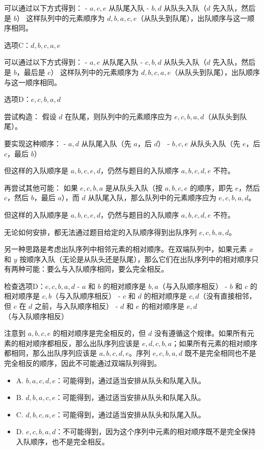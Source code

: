 \documentclass[lang=cn,newtx,10pt,scheme=chinese]{../../../elegantbook}
\begin{document}
\begin{enumerate}
    可以通过以下方式得到：
    - $a, c, e$ 从队尾入队
    - $b, d$ 从队头入队（$d$ 先入队，然后是 $b$）
    这样队列中的元素顺序为 $d, b, a, c, e$（从队头到队尾），出队顺序与这一顺序相同。
    
    选项C：$d, b, c, a, e$
    
    可以通过以下方式得到：
    - $a, e$ 从队尾入队
    - $c, b, d$ 从队头入队（$d$ 先入队，然后是 $b$，最后是 $c$）
    这样队列中的元素顺序为 $d, b, c, a, e$（从队头到队尾），出队顺序与这一顺序相同。
    
    选项D：$e, c, b, a, d$
    
    尝试构造：
    假设 $d$ 在队尾，则队列中的元素顺序应为 $e, c, b, a, d$（从队头到队尾）。
    
    要实现这种顺序：
    - $a, d$ 从队尾入队（先 $a$，后 $d$）
    - $b, c, e$ 从队头入队（先 $e$，后 $c$，最后 $b$）
    
    但这样的入队顺序是 $a, b, c, e, d$，仍然与题目的入队顺序 $a, b, c, d, e$ 不符。

    再尝试其他可能：
    如果 $e, c, b, a$ 是从队头入队（按 $a, b, c, e$ 的顺序，即先 $e$，然后 $c$，然后 $b$，最后 $a$），而 $d$ 从队尾入队，那么队列中的元素顺序应为 $e, c, b, a, d$。
    
    但这样的入队顺序是 $a, b, c, e, d$，仍然与题目的入队顺序 $a, b, c, d, e$ 不符。

    无论如何安排，都无法通过题目给定的入队顺序得到出队序列 $e, c, b, a, d$。

    另一种思路是考虑出队序列中相邻元素的相对顺序。在双端队列中，如果元素 $x$ 和 $y$ 按顺序入队（无论是从队头还是队尾），那么它们在出队序列中的相对顺序只有两种可能：要么与入队顺序相同，要么完全相反。

    检查选项D：$e, c, b, a, d$
    - $a$ 和 $b$ 的相对顺序是 $b, a$（与入队顺序相反）
    - $b$ 和 $c$ 的相对顺序是 $c, b$（与入队顺序相反）
    - $c$ 和 $d$ 的相对顺序是 $c, d$（没有直接相邻，但 $c$ 在 $d$ 之前，与入队顺序相反）
    - $d$ 和 $e$ 的相对顺序是 $e, d$（与入队顺序相反）
    
    注意到 $a, b, c, e$ 的相对顺序是完全相反的，但 $d$ 没有遵循这个规律。如果所有元素的相对顺序都相反，那么出队序列应该是 $e, d, c, b, a$；如果所有元素的相对顺序都相同，那么出队序列应该是 $a, b, c, d, e$。序列 $e, c, b, a, d$ 既不是完全相同也不是完全相反的顺序，因此不可能通过双端队列得到。

    \begin{itemize}
        \item A. $b, a, c, d, e$：可能得到，通过适当安排从队头和队尾入队。
        \item B. $d, b, a, c, e$：可能得到，通过适当安排从队头和队尾入队。
        \item C. $d, b, c, a, e$：可能得到，通过适当安排从队头和队尾入队。
        \item D. $e, c, b, a, d$：不可能得到，因为这个序列中元素的相对顺序既不是完全保持入队顺序，也不是完全相反。
    \end{itemize}


\end{enumerate}
\end{document}
